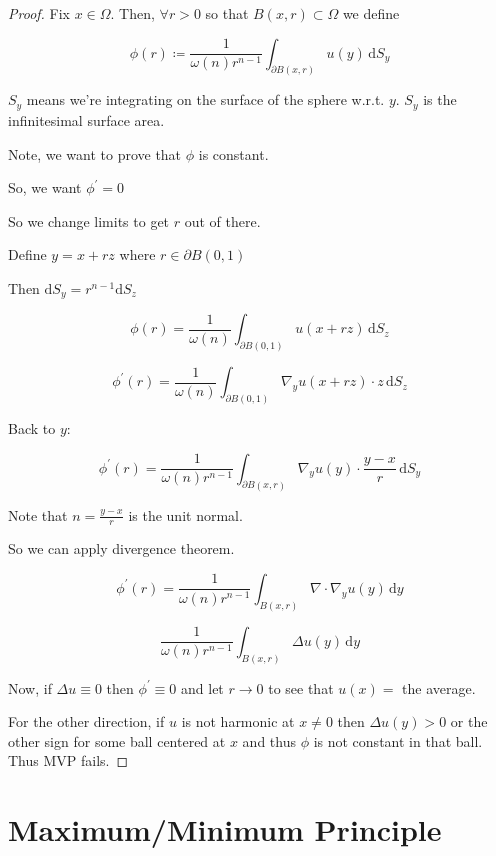 \documentclass{article}
\theoremstyle{definition}
\begin{document}
\begin{proof}

    Fix \(x\in \Omega\). Then, \(\forall r>0\) so that \(B(x,r)\subset \Omega\) we define
    
    \[
        \phi(r)\coloneqq \frac{1}{\omega (n)r^{n-1} }\int_{\partial B(x,r)}^{} u(y) \,\mathrm{d}S_y 
    \]

    \(S_y\) means we're integrating on the surface of the sphere w.r.t. \(y\). \(S_y\) is the infinitesimal surface area.

    Note, we want to prove that \(\phi\) is constant.

    So, we want \(\phi^{\prime} =0\) 

    So we change limits to get \(r\) out of there.

    Define \(y=x+rz\) where \(r\in \partial B(0,1)\) 

    Then \(\mathrm{d} S_y = r^{n-1} \mathrm{d} S_z\)
    
    \[
        \phi (r)=\frac{1}{\omega (n)}\int_{\partial B(0,1)}^{} u(x+rz) \,\mathrm{d}S_z
    \] 

    \[
        \phi^{\prime} (r) = \frac{1}{\omega (n)} \int_{\partial B(0,1)}^{} \nabla_y u(x+rz)\cdot z \,\mathrm{d}S_z 
    \]

    Back to \(y\):
    
    \[
        \phi^{\prime} (r)=\frac{1}{\omega (n)r^{n-1}}\int_{\partial B(x,r)}^{} \nabla_y u(y)\cdot \frac{y-x}{r} \,\mathrm{d}S_y 
    \]

    Note that \(n=\frac{y-x}{r}\) is the unit normal.

    So we can apply divergence theorem.

    \[
        \phi^{\prime} (r) = \frac{1}{\omega(n)r^{n-1}}\int_{B(x,r)}^{} \nabla\cdot\nabla_y u(y) \,\mathrm{d}y  
    \]

    \[
        \frac{1}{\omega(n) r^{n-1}}\int_{B(x,r)}^{} \Delta u(y) \,\mathrm{d}y 
    \]

    Now, if \(\Delta u \equiv 0\) then \(\phi^{\prime} \equiv 0\) and let \(r\to 0\) to see that \(u(x)=\) the average.

    For the other direction, if \(u\) is not harmonic at \(x\neq 0\) then \(\Delta u(y)>0\) or the other sign for some ball centered at \(x\) and thus \(\phi\) is not constant in that ball. Thus MVP fails.

\end{proof}

\section*{Maximum/Minimum Principle}
\end{document}
